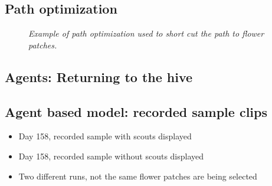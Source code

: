 \documentclass[
	paper=128mm:96mm,
	fontsize=11pt,
	pagesize,
	parskip=half-,
]{scrartcl}
\theoremstyle{mythmstyle} %
\begin{document}
\subsection{Path optimization}
	\begin{figure}[H]
		\centering
		\caption{\textit{Example of path optimization used to short cut the path to flower patches.}}
		\label{fig:pathOptimization}
	\end{figure}


\subsection{Agents: Returning to the hive}
	
	\clearpage


\subsection{Agent based model: recorded sample clips}
	\begin{itemize}
		\item Day 158, recorded sample with scouts displayed
		\item Day 158, recorded sample without scouts displayed
		\item Two different runs, not the same flower patches are being selected
	\end{itemize}
	\clearpage
\end{document}
